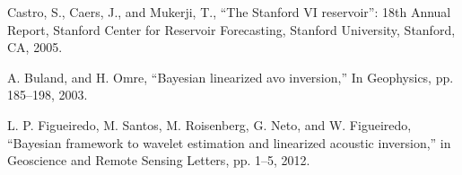 \documentclass[journal]{IEEEtran}
\begin{document}
\begin{thebibliography}{1}
Castro, S., Caers, J., and Mukerji, T., “The Stanford VI reservoir”: 18th Annual Report, Stanford Center for Reservoir Forecasting, Stanford University, Stanford, CA, 2005.

A. Buland,  and H. Omre, ``Bayesian linearized avo inversion,'' In Geophysics, pp. 185--198, 2003.

L. P. Figueiredo, M. Santos, M. Roisenberg, G. Neto, and W. Figueiredo, ``Bayesian framework to wavelet estimation and linearized acoustic inversion,'' in Geoscience and Remote Sensing Letters, pp. 1--5, 2012.

\end{thebibliography}




\end{document}
